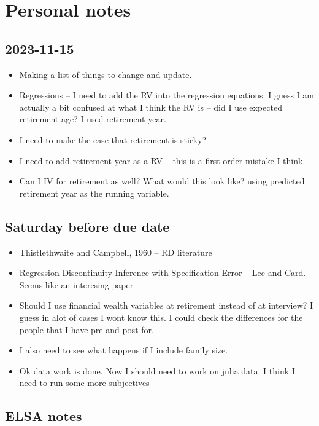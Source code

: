 \documentclass[12pt]{article}
\begin{document}
\section{Personal notes}

\subsection{2023-11-15}
\begin{itemize}
    \item Making a list of things to change and update.
    \item Regressions -- I need to add the RV into the regression equations. I
          guess I am actually a bit confused at what I think the RV is -- did I use
          expected retirement age? I used retirement year.

    \item I need to make the case that retirement is sticky?
    \item I need to add retirement year as a RV -- this is a first order
          mistake I think.

    \item Can I IV for retirement as well? What would this look like?
          using predicted retirement year as the running variable.

\end{itemize}

\subsection{Saturday before due date}
\begin{itemize}
    \item Thistlethwaite and Campbell, 1960 -- RD literature
    \item Regression Discontinuity Inference with Specification Error -- Lee and Card. Seems like an interesing paper
    \item Should I use financial wealth variables at retirement instead of at interview? I guess in alot of cases I wont
          know this. I could check the differences for the people that I have pre and post for.
    \item I also need to see what happens if I include family size.
    \item Ok data work is done. Now I should need to work on julia data. I think I need to run some more subjectives
\end{itemize}

\subsection{ELSA notes}
\end{document}
